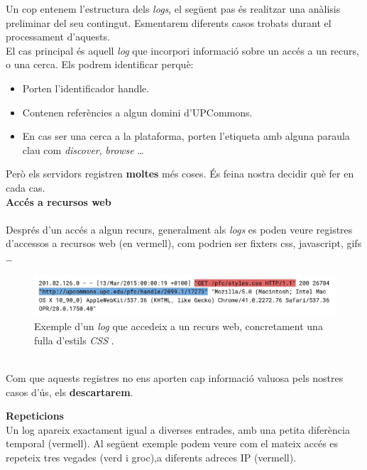 Un cop entenem l'estructura dels \textit{logs}, el següent pas és realitzar una anàlisis preliminar del seu contingut.
Esmentarem diferents casos trobats durant el processament d'aquests. \\

\noindent
El cas principal és aquell \textit{log} que incorpori informació sobre un accés a un recurs, o una cerca.
Els podrem identificar perquè:

\begin{itemize}
    \item Porten l’identificador \gls{handle}.
    \item Contenen referències a algun domini d’\gls{UPCommons}.
    \item En cas ser una cerca a la plataforma, porten l’etiqueta amb alguna paraula clau com \textit{discover}, \textit{browse} \dots
\end{itemize}

\noindent
Però els servidors registren \textbf{moltes} més coses.
És feina nostra decidir què fer en cada cas. \\

\noindent
\textbf{Accés a recursos web} \\ \\
Després d’un accés a algun recurs, generalment als \textit{logs} es poden veure registres d’accessos a recursos web (en vermell),
com podrien ser fixters css, javascript, gifs …

\begin{figure}[htbp]
    \centerline{\includegraphics[width=\textwidth]{figures/log-web-resource}}
    \captionsetup{justification=centering}
    \caption{Exemple d'un \textit{log} que accedeix a un recurs web, concretament una fulla d'estils \textit{\gls{CSS}} .}\label{fig:log-web-resource}
\end{figure}

\noindent \\
Com que aquests registres no ens aporten cap informació valuosa pels nostres casos d'ús, els \textbf{descartarem}.

\clearpage

\noindent
\textbf{Repeticions} \\

\noindent
Un log apareix exactament igual a diverses entrades, amb una petita diferència temporal (vermell).
Al següent exemple podem veure com el mateix accés es repeteix tres vegades (verd i groc),a diferents adreces \gls{IP} (vermell).

